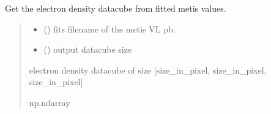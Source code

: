 \documentclass[letterpaper,10pt,english]{sphinxmanual}
\begin{document}
\begin{fulllineitems}
\label{\detokenize{doppler_dimming_lib:doppler_dimming_lib.metis.datacube_from_map}}
\pysigstartsignatures
{}
\pysigstopsignatures
\end{fulllineitems}


\begin{fulllineitems}
\label{\detokenize{doppler_dimming_lib:doppler_dimming_lib.metis.density_dc_from_ddt}}
\pysigstartsignatures
{}
\pysigstopsignatures
\sphinxAtStartPar
Get the electron density datacube from fitted metis values.
\begin{quote}\begin{description}
\begin{itemize}
\item {} 
\sphinxAtStartPar
{} () \textendash{} fits filename of the metis VL pb.

\item {} 
\sphinxAtStartPar
{} () \textendash{} output datacube size

\end{itemize}

\sphinxAtStartPar
electron density datacube of size {[}size\_in\_pixel, size\_in\_pixel, size\_in\_pixel{]}

\sphinxAtStartPar
np.ndarray

\end{description}\end{quote}

\end{fulllineitems}
\end{document}
